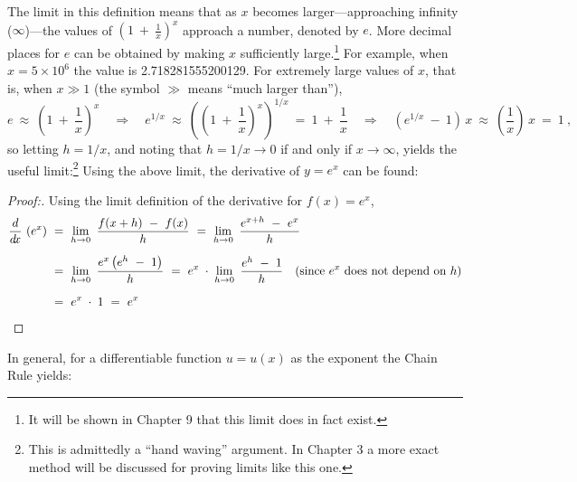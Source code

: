 The limit in this definition means that as $x$ becomes larger---approaching
infinity ($\infty$)---the values of $\left( 1 ~+~ \frac{1}{x} \right)^x$
approach a number, denoted by $e$. More decimal places for $e$ can be obtained
by making $x$ sufficiently large.\footnote{It will be shown in Chapter 9 that
this limit does in fact exist.} For example, when $x=5 \times 10^6$ the value is
2.718281555200129. For extremely large values of $x$, that
is, when $x \gg 1$ (the symbol $\gg$ means ``much larger than''),\index{$\gg$}
\begin{displaymath}
 e ~\approx~ \left( 1 ~+~ \frac{1}{x} \right)^x \quad\Rightarrow\quad
 e^{1/x} ~\approx~ \left(\left( 1 ~+~ \frac{1}{x} \right)^x\right)^{1/x} ~=~
 1 ~+~ \frac{1}{x} \quad\Rightarrow\quad \left(e^{1/x} ~-~ 1\right)\,x ~\approx~
 \left(\frac{1}{x}\right)\,x ~=~ 1 ~,
\end{displaymath}
so letting $h = 1/x$, and noting that $h = 1/x \to 0$ if and only if
$x \to \infty$, yields the useful limit:\footnote{This is admittedly a
``hand waving'' argument. In Chapter 3 a more exact method will be discussed for
proving limits like this one.}
Using the above limit, the derivative of $y = e^x$ can be found:
\begin{proofbar}\vspace{-3mm}\begin{proof}[Proof:]
Using the limit definition of the derivative for $f(x) = e^x$,
\begin{align*}
 \frac{d}{d\!x}\,\left(e^x\right) ~&=~ \lim_{h \to 0} ~\frac{f(x+h) ~-~ f(x)}{h}
  ~=~ \lim_{h \to 0} ~\frac{e^{x+h} ~-~ e^x}{h}\\[6pt]
 &=~ \lim_{h \to 0} ~\frac{e^x \left(e^h ~-~ 1\right)}{h}
 ~=~ e^x \;\cdot\; \lim_{h \to 0}~\frac{e^h ~-~ 1}{h}
     \quad\text{(since $e^x$ does not depend on $h$)}\\[6pt]
 &=~ e^x \;\cdot\; 1 ~=~ e^x
\end{align*}
\vspace{-3mm}
\end{proof}\end{proofbar}
In general, for a differentiable function $u = u(x)$ as the exponent the
Chain Rule yields:

